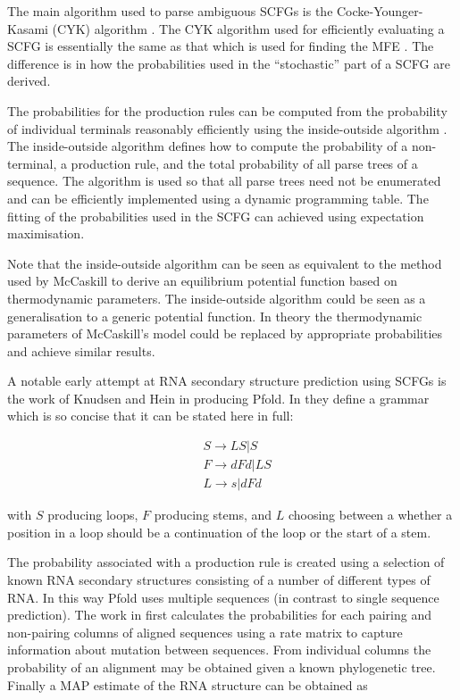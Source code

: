 \documentclass[journal]{IEEEtran}
\begin{document}
The main algorithm used to parse ambiguous SCFGs is the Cocke-Younger-Kasami (CYK) algorithm \cite{giegerich2014introduction, cocke1969programming, younger1967recognition, kasami1965efficient} . The CYK algorithm used for efficiently evaluating a SCFG is essentially the same as that which is used for finding the MFE \cite{zuker1981optimal}. The difference is in how the probabilities used in the ``stochastic'' part of a SCFG are derived.

The probabilities for the production rules can be computed from the probability of individual terminals reasonably efficiently using the inside-outside algorithm \cite{lari1990estimation}. The inside-outside algorithm defines how to compute the probability of a non-terminal, a production rule, and the total probability of all parse trees of a sequence. The algorithm is used so that all parse trees need not be enumerated and can be efficiently implemented using a dynamic programming table. The fitting of the probabilities used in the SCFG can achieved using expectation maximisation. 

Note that the inside-outside algorithm can be seen as equivalent to the method used by McCaskill \cite{mccaskill1990equilibrium} to derive an equilibrium potential function based on thermodynamic parameters. The inside-outside algorithm could be seen as a generalisation to a generic potential function. In theory the thermodynamic parameters of McCaskill's model could be replaced by appropriate probabilities and achieve similar results.

A notable early attempt at RNA secondary structure prediction using SCFGs is the work of Knudsen and Hein \cite{knudsen1999rna, knudsen2003pfold} in producing Pfold. In \cite{knudsen1999rna} they define a grammar which is so concise that it can be stated here in full:

\begin{equation}
\begin{split}
	& S \rightarrow LS | S \\
	& F \rightarrow dFd | LS \\
	& L \rightarrow s | dFd 
\end{split}
\end{equation}

with $S$ producing loops, $F$ producing stems, and $L$ choosing between a whether a position in a loop should be a continuation of the loop or the start of a stem.

The probability associated with a production rule is created using a selection of known RNA secondary structures consisting of a number of different types of RNA. In this way Pfold uses multiple sequences (in contrast to single sequence prediction). The work in \cite{knudsen1999rna} first calculates the probabilities for each pairing and non-pairing columns of aligned sequences using a rate matrix to capture information about mutation between sequences. From individual columns the probability of an alignment may be obtained given a known phylogenetic tree. Finally a MAP estimate of the RNA structure can be obtained as
\end{document}
